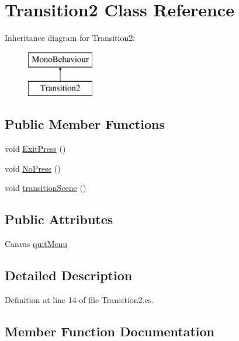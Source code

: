 \hypertarget{class_transition2}{}\section{Transition2 Class Reference}
\label{class_transition2}
Inheritance diagram for Transition2\+:\begin{figure}[H]
\begin{center}
\leavevmode
\includegraphics[height=2.000000cm]{class_transition2}
\end{center}
\end{figure}
\subsection*{Public Member Functions}
\begin{DoxyCompactItemize}
\item 
void \hyperlink{class_transition2_ac7ff3fc26ca27062e468add114ef890a}{Exit\+Press} ()
\item 
void \hyperlink{class_transition2_a3d85518cb434a02cf4635ff8fc1d4b65}{No\+Press} ()
\item 
void \hyperlink{class_transition2_a051383599c21c51604589cadec4bdcf1}{transition\+Scene} ()
\end{DoxyCompactItemize}
\subsection*{Public Attributes}
\begin{DoxyCompactItemize}
\item 
Canvas \hyperlink{class_transition2_a2f95f61b801d5c9995910a8c7b3ed48d}{quit\+Menu}
\end{DoxyCompactItemize}


\subsection{Detailed Description}


Definition at line 14 of file Transition2.\+cs.



\subsection{Member Function Documentation}
\hypertarget{class_transition2_ac7ff3fc26ca27062e468add114ef890a}{}\label{class_transition2_ac7ff3fc26ca27062e468add114ef890a} 
